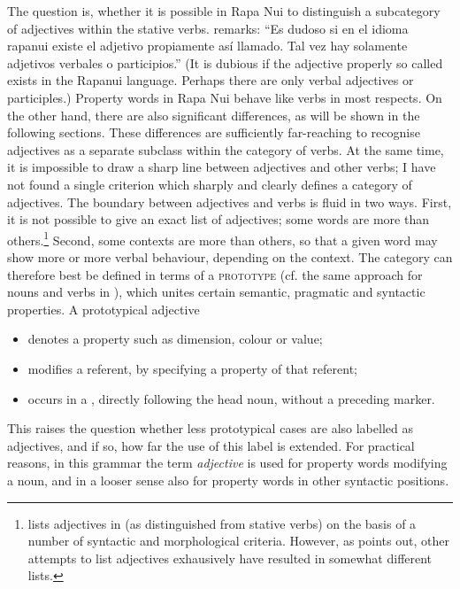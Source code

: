 The question is, whether it is possible in Rapa Nui to distinguish a subcategory of adjectives within the stative verbs. \citet[28]{Englert1978} remarks: “Es dudoso si en el idioma rapanui existe el adjetivo propiamente así llamado. Tal vez hay solamente adjetivos verbales o participios.” (It is dubious if the adjective properly so called exists in the Rapanui language. Perhaps there are only verbal adjectives or participles.) Property words in Rapa Nui behave like verbs in most respects. On the other hand, there are also significant differences, as will be shown in the following sections. These differences are sufficiently far-reaching to recognise adjectives as a separate subclass within the category of verbs. At the same time, it is impossible to draw a sharp line between adjectives and other verbs; I have not found a single criterion which sharply and clearly defines a category of adjectives. The boundary between adjectives and verbs is fluid in two ways. First, it is not possible to give an exact list of adjectives; some words are more  than others.\footnote{\label{fn:120}\citet[8]{Hohepa1969Not} lists adjectives in  (as distinguished from stative verbs) on the basis of a number of syntactic and morphological criteria. However, as \citet[106]{Harlow2007Maori} points out, other attempts to list  adjectives exhausively have resulted in somewhat different lists.} Second, some contexts are more  than others, so that a given word may show more  or more verbal behaviour, depending on the context. The  category can therefore best be defined in terms of a \textsc{prototype} (cf. the same approach for nouns and verbs in ), which unites certain semantic, pragmatic and syntactic properties. A prototypical adjective

\begin{itemize}
\item 
denotes a property such as dimension, colour or value;

\item 
modifies a referent, by specifying a property of that referent;

\item 
occurs in a , directly following the head noun, without a preceding  marker.

\end{itemize}

This raises the question whether less prototypical cases are also labelled as adjectives, and if so, how far the use of this label is extended. For practical reasons, in this grammar the term \textit{adjective} is used for property words modifying a noun, and in a looser sense also for property words in other syntactic positions.

